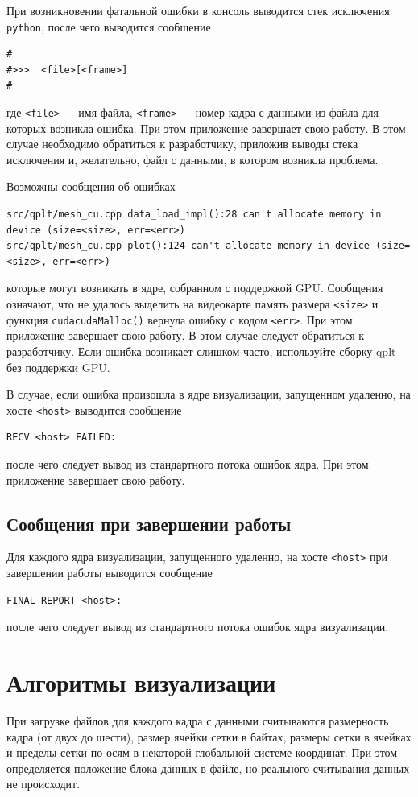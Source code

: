 \documentclass[12pt]{article}
\begin{document}
\begin{enumrate}
При возникновении фатальной ошибки в консоль выводится стек исключения \verb'python',
после чего выводится сообщение
\begin{verbatim}
#
#>>>  <file>[<frame>]
#
\end{verbatim}
где \verb'<file>' --- имя файла, \verb'<frame>' --- номер кадра с данными из файла для которых возникла ошибка.
При этом приложение завершает свою работу.
В этом случае необходимо обратиться к разработчику, приложив выводы стека исключения
и, желательно, файл с данными, в котором возникла проблема.

Возможны сообщения об ошибках
\begin{verbatim}
src/qplt/mesh_cu.cpp data_load_impl():28 can't allocate memory in device (size=<size>, err=<err>)
src/qplt/mesh_cu.cpp plot():124 can't allocate memory in device (size=<size>, err=<err>)
\end{verbatim}
которые могут возникать в ядре, собранном с поддержкой GPU. Сообщения означают, что не удалось выделить на видеокарте память размера \verb'<size>'
и функция \verb'cudacudaMalloc()' вернула ошибку с кодом \verb'<err>'. При этом приложение завершает свою работу.
В этом случае следует обратиться к разработчику. Если ошибка возникает слишком часто, используйте сборку qplt без поддержки GPU.

В случае, если ошибка произошла в ядре визуализации, запущенном удаленно, на хосте \verb'<host>' выводится сообщение
\begin{verbatim}
RECV <host> FAILED:
\end{verbatim}
после чего следует вывод из стандартного потока ошибок ядра. При этом приложение завершает свою работу.

\subsection{Сообщения при завершении работы}
Для каждого ядра визуализации, запущенного удаленно, на хосте \verb'<host>' при завершении работы выводится сообщение
\begin{verbatim}
FINAL REPORT <host>:
\end{verbatim}
после чего следует вывод из стандартного потока ошибок ядра визуализации. 

\section{Алгоритмы визуализации}
При загрузке файлов для каждого кадра с данными считываются размерность кадра (от двух до шести), размер ячейки сетки в байтах, размеры сетки в ячейках
и пределы сетки по осям в некоторой глобальной системе координат. При этом определяется положение блока данных в файле, но реального считывания данных не происходит.


\end{enumrate}
\end{document}
